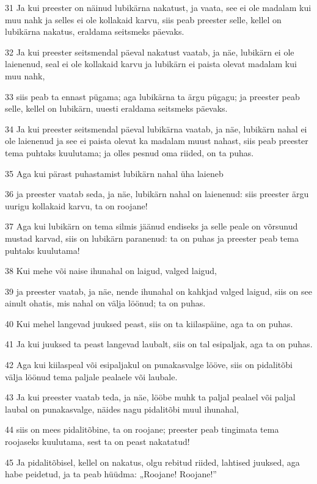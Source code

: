 \par 31 Ja kui preester on näinud lubikärna nakatust, ja vaata, see ei ole madalam kui muu nahk ja selles ei ole kollakaid karvu, siis peab preester selle, kellel on lubikärna nakatus, eraldama seitsmeks päevaks.
\par 32 Ja kui preester seitsmendal päeval nakatust vaatab, ja näe, lubikärn ei ole laienenud, seal ei ole kollakaid karvu ja lubikärn ei paista olevat madalam kui muu nahk,
\par 33 siis peab ta ennast pügama; aga lubikärna ta ärgu pügagu; ja preester peab selle, kellel on lubikärn, uuesti eraldama seitsmeks päevaks.
\par 34 Ja kui preester seitsmendal päeval lubikärna vaatab, ja näe, lubikärn nahal ei ole laienenud ja see ei paista olevat ka madalam muust nahast, siis peab preester tema puhtaks kuulutama; ja olles pesnud oma riided, on ta puhas.
\par 35 Aga kui pärast puhastamist lubikärn nahal üha laieneb
\par 36 ja preester vaatab seda, ja näe, lubikärn nahal on laienenud: siis preester ärgu uurigu kollakaid karvu, ta on roojane!
\par 37 Aga kui lubikärn on tema silmis jäänud endiseks ja selle peale on võrsunud mustad karvad, siis on lubikärn paranenud: ta on puhas ja preester peab tema puhtaks kuulutama!
\par 38 Kui mehe või naise ihunahal on laigud, valged laigud,
\par 39 ja preester vaatab, ja näe, nende ihunahal on kahkjad valged laigud, siis on see ainult ohatis, mis nahal on välja löönud; ta on puhas.
\par 40 Kui mehel langevad juuksed peast, siis on ta kiilaspäine, aga ta on puhas.
\par 41 Ja kui juuksed ta peast langevad laubalt, siis on tal esipaljak, aga ta on puhas.
\par 42 Aga kui kiilaspeal või esipaljakul on punakasvalge lööve, siis on pidalitõbi välja löönud tema paljale pealaele või laubale.
\par 43 Ja kui preester vaatab teda, ja näe, lööbe muhk ta paljal pealael või paljal laubal on punakasvalge, näides nagu pidalitõbi muul ihunahal,
\par 44 siis on mees pidalitõbine, ta on roojane; preester peab tingimata tema roojaseks kuulutama, sest ta on peast nakatatud!
\par 45 Ja pidalitõbisel, kellel on nakatus, olgu rebitud riided, lahtised juuksed, aga habe peidetud, ja ta peab hüüdma: „Roojane! Roojane!”
